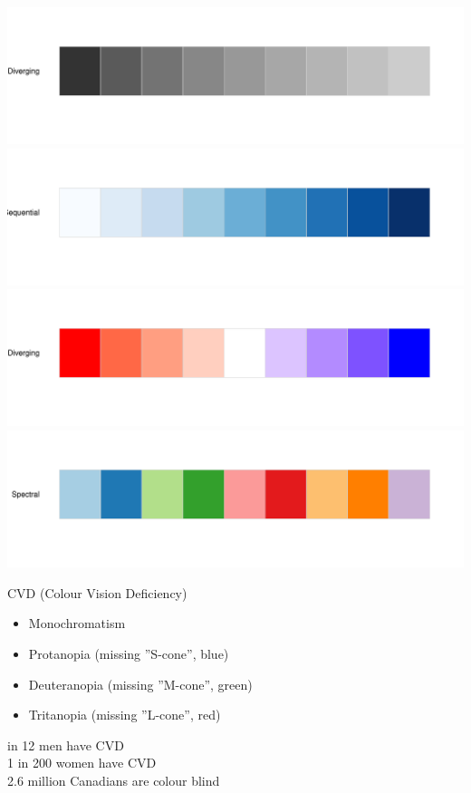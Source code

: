 \documentclass[ignorenonframetext,xcolor=x11names]{beamer}
\begin{document}
\begin{frame}{}
\centering

  \includegraphics[width=.7\textwidth]{monochromatic.pdf}
  \includegraphics[width=.7\textwidth]{sequential.pdf}
  \includegraphics[width=.7\textwidth]{diverging.pdf}
  \includegraphics[width=.7\textwidth]{brewer.paired.pdf}
\end{frame}

\begin{frame}{CVD (Colour Vision Deficiency)}
\begin{itemize}
  \item Monochromatism
  \item Protanopia (missing ''S-cone'', blue)
  \item Deuteranopia (missing ''M-cone'', green)
  \item Tritanopia (missing ''L-cone'', red)
\end{itemize}
\vspace{1cm}
 in 12 men have CVD \\
1 in 200 women have CVD \\
2.6 million Canadians are colour blind
\end{frame}
\end{document}
